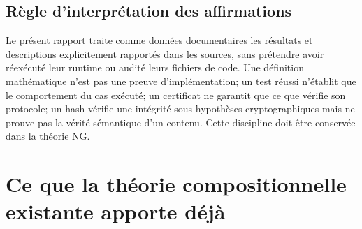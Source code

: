 \documentclass[11pt,a4paper]{article}
\begin{document}
\subsection{Règle d'interprétation des affirmations}
Le présent rapport traite comme données documentaires les résultats et descriptions explicitement rapportés dans les sources, sans prétendre avoir réexécuté leur runtime ou audité leurs fichiers de code. Une définition mathématique n'est pas une preuve d'implémentation; un test réussi n'établit que le comportement du cas exécuté; un certificat ne garantit que ce que vérifie son protocole; un hash vérifie une intégrité sous hypothèses cryptographiques mais ne prouve pas la vérité sémantique d'un contenu. Cette discipline doit être conservée dans la théorie NG.

\section{Ce que la théorie compositionnelle existante apporte déjà}
\end{document}
